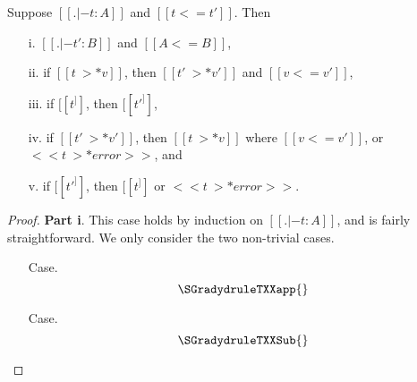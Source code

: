 \begin{theorem}
  \label{thm:gradual_guarantee}
  Suppose $[[. |- t : A]]$ and $[[t <= t']]$.  Then
  \begin{itemize}
  \item[i.] $[[. |- t' : B]]$ and $[[A <= B]]$,
  \item[ii.] if $[[t ~>* v]]$, then $[[t' ~>* v']]$ and $[[v <= v']]$,
  \item[iii.] if $[[t ^]]$, then $[[t' ^]]$,
  \item[iv.] if $[[t' ~>* v']]$, then $[[t ~>* v]]$ where $[[v <= v']]$, or $<<t ~>* error>>$, and
  \item [v.] if $[[t' ^]]$, then $[[t ^]]$ or $<<t ~>* error>>$.
  \end{itemize}
\end{theorem}
\begin{proof}
  \textbf{Part i}. This case holds by induction on $[[. |- t : A]]$,
  and is fairly straightforward.  We only consider the two non-trivial
  cases.
  \begin{itemize}
  \item[] Case.
    \[
    \SGradydruleTXXapp{}
    \]
    
  \item[] Case.
    \[
    \SGradydruleTXXSub{}
    \]
    
  \end{itemize}

\end{proof}
